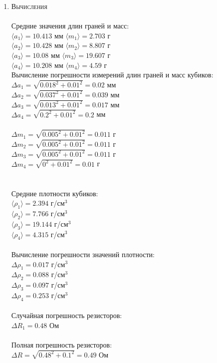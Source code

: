 \documentclass[12pt]{article}
\begin{document}
\begin{enumerate}
    \item \large\textsc{Вычисления} \\
    \\
    Средние значения длин граней и масс: \\
    $ \langle a_1 \rangle = 10.413 $ мм $ \langle m_1 \rangle = 2.703 $ г \\
    $ \langle a_2 \rangle = 10.428 $ мм $ \langle m_2 \rangle = 8.807 $ г \\
    $ \langle a_3 \rangle = 10.08 $ мм $ \langle m_3 \rangle = 19.607 $ г \\
    $ \langle a_4 \rangle = 10.208 $ мм $ \langle m_4 \rangle = 4.59 $ г \\
    Вычисление погрешности измерений длин граней и масс кубиков: \\ 
    $\Delta a_1 = \sqrt{0.018^2 + 0.01^2} = 0.02$ мм \\
    $\Delta a_2 = \sqrt{0.037^2 + 0.01^2} = 0.039$ мм\\
    $\Delta a_3 = \sqrt{0.013^2 + 0.01^2} = 0.017$ мм\\
    $\Delta a_4 = \sqrt{0.2^2 + 0.01^2} = 0.2$ мм\\
    \\
    $\Delta m_1 = \sqrt{0.005^2 + 0.01^2} = 0.011$ г \\
    $\Delta m_2 = \sqrt{0.005^2 + 0.01^2} = 0.011$ г \\
    $\Delta m_3 = \sqrt{0.005^2 + 0.01^2} = 0.011$ г \\
    $\Delta m_4 = \sqrt{0^2 + 0.01^2} = 0.01$ г \\ \\ \\
    Средние плотности кубиков: \\
    $ \langle \rho_1 \rangle = 2.394 $ г/см$^3$ \\
    $ \langle \rho_2 \rangle = 7.766 $ г/см$^3$ \\
    $ \langle \rho_3 \rangle = 19.144 $ г/см$^3$ \\
    $ \langle \rho_4 \rangle = 4.315 $ г/см$^3$ \\ \\
    Вычисление погрешности значений плотности:\\
    $\Delta \rho_1 = 0.017$ г/см$^3$\\
    $\Delta \rho_2 = 0.088$ г/см$^3$\\
    $\Delta \rho_3 = 0.097$ г/см$^3$\\
    $\Delta \rho_4 = 0.253$ г/см$^3$\\ \\
    Случайная погрешность резисторов: \\
    $\Delta R_1 = 0.48 $ Ом \\ \\
    Полная погрешность резисторов: \\
    $\Delta R = \sqrt{0.48^2 + 0.1^2} = 0.49 $ Ом
    

\end{enumerate}
\end{document}

